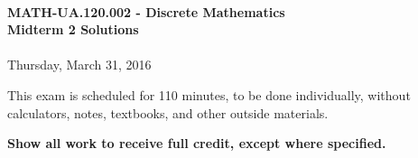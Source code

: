 \documentclass[12pt]{article}
\begin{document}
\thispagestyle{firststyle}
~
\vspace{0.5cm}

\begin{center}
\textbf{\Large MATH-UA.120.002 - Discrete Mathematics \\ \vspace{0.5cm} Midterm 2 Solutions}\\~\\
Thursday, March 31, 2016
\end{center}

\vspace{1cm}


\vspace{1cm}

\noindent
This exam is scheduled for 110 minutes, to be done individually, without calculators, notes, textbooks, and other outside materials.
\vspace{0.5cm}

\noindent
\textbf{Show all work to receive full credit, except where specified.}

\vspace{1cm}
\end{document}
